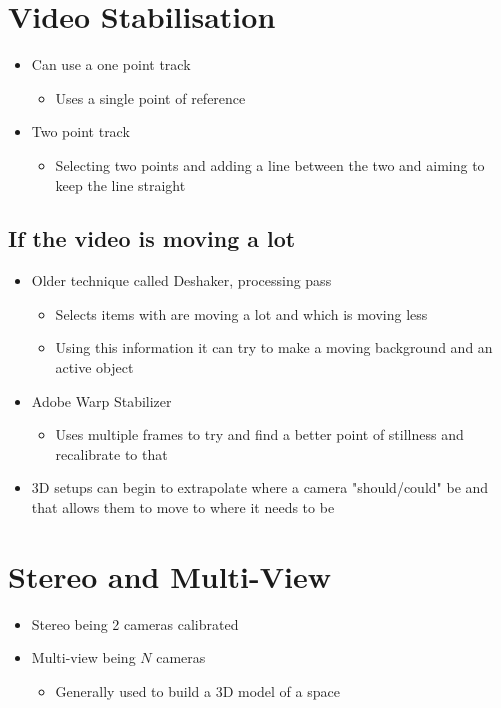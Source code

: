 \documentclass[a4paper]{article}
\begin{document}
\section{Video Stabilisation}
\label{sec-5}
\begin{itemize}
\item Can use a one point track 
\begin{itemize}
\item Uses a single point of reference
\end{itemize}
\item Two point track
\begin{itemize}
\item Selecting two points and adding a line between the two and aiming to keep the line straight
\end{itemize}
\end{itemize}

\subsection{If the video is moving a lot}
\label{sec-5-1}
\begin{itemize}
\item Older technique called Deshaker, processing pass
\begin{itemize}
\item Selects items with are moving a lot and which is moving less
\item Using this information it can try to make a moving background and an active object
\end{itemize}
\item Adobe Warp Stabilizer
\begin{itemize}
\item Uses multiple frames to try and find a better point of stillness and recalibrate to that
\end{itemize}
\item 3D setups can begin to extrapolate where a camera "should/could" be and that allows them to move to where it needs to be
\end{itemize}
\section{Stereo and Multi-View}
\label{sec-6}
\begin{itemize}
\item Stereo being 2 cameras calibrated
\item Multi-view being $N$ cameras
\begin{itemize}
\item Generally used to build a 3D model of a space
\end{itemize}
\end{itemize}
\end{document}
